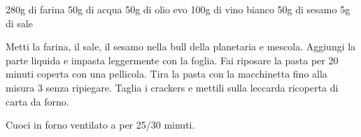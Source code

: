 \begin{ingreds}
	280g di farina
	50g di acqua
	50g di olio evo
	100g di vino bianco
	50g di sesamo
	5g di sale
\end{ingreds}

\begin{method}
	Metti la farina, il sale, il sesamo nella bull della planetaria e mescola. Aggiungi la parte liquida e impasta leggermente con la foglia. Fai riposare la pasta per 20 minuti coperta con una pellicola.
	Tira la pasta con la macchinetta fino alla misura 3 senza ripiegare. Taglia i crackers e mettili sulla leccarda ricoperta di carta da forno.

	Cuoci in forno ventilato a  per 25/30 minuti.
\end {method}

